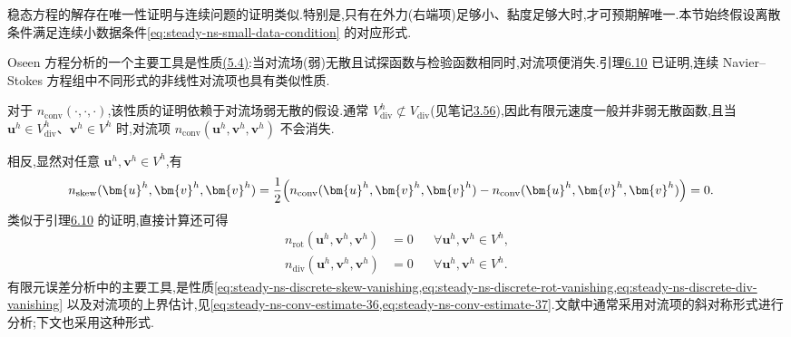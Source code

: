 稳态方程的解存在唯一性证明与连续问题的证明类似.特别是,只有在外力(右端项)足够小、黏度足够大时,才可预期解唯一.本节始终假设离散条件满足连续小数据条件\cref{eq:steady-ns-small-data-condition} 的对应形式.

\begin{note}[有限元误差分析中的对流项]\label{note:steady-ns-discrete-convection}
Oseen 方程分析的一个主要工具是性质\hyperref[eq:oseen-convection-skew]{(5.4)}:当对流场(弱)无散且试探函数与检验函数相同时,对流项便消失.引理\hyperref[lem:steady-ns-convection-vanishing]{6.10} 已证明,连续 Navier--Stokes 方程组中不同形式的非线性对流项也具有类似性质.

对于 $n_{\mathrm{conv}}(\cdot,\cdot,\cdot)$,该性质的证明依赖于对流场弱无散的假设.通常 $V_{\mathrm{div}}^h\not\subset V_{\mathrm{div}}$(见笔记\hyperref[note:mass-conservation-discrete-spaces]{3.56}),因此有限元速度一般并非弱无散函数,且当 $\bm{u}^h\in V_{\mathrm{div}}^h$、$\bm{v}^h\in V^h$ 时,对流项 $n_{\mathrm{conv}}(\bm{u}^h,\bm{v}^h,\bm{v}^h)$ 不会消失.

相反,显然对任意 $\bm{u}^h,\bm{v}^h\in V^h$,有
\begin{equation}\label{eq:steady-ns-discrete-skew-vanishing}
\begin{aligned}
  n_{\mathrm{skew}}(\bm{u}^h,\bm{v}^h,\bm{v}^h)
   &=\frac12\Bigl(
       n_{\mathrm{conv}}(\bm{u}^h,\bm{v}^h,\bm{v}^h)
       -n_{\mathrm{conv}}(\bm{u}^h,\bm{v}^h,\bm{v}^h)\Bigr)=0.
\end{aligned}
\end{equation}
类似于引理\hyperref[lem:steady-ns-convection-vanishing]{6.10} 的证明,直接计算还可得
\begin{align}
  n_{\mathrm{rot}}(\bm{u}^h,\bm{v}^h,\bm{v}^h)&=0
    &&\forall\bm{u}^h,\bm{v}^h\in V^h,\label{eq:steady-ns-discrete-rot-vanishing}\\
  n_{\mathrm{div}}(\bm{u}^h,\bm{v}^h,\bm{v}^h)&=0
    &&\forall\bm{u}^h,\bm{v}^h\in V^h.\label{eq:steady-ns-discrete-div-vanishing}
\end{align}
有限元误差分析中的主要工具,是性质\cref{eq:steady-ns-discrete-skew-vanishing,eq:steady-ns-discrete-rot-vanishing,eq:steady-ns-discrete-div-vanishing} 以及对流项的上界估计,见\cref{eq:steady-ns-conv-estimate-36,eq:steady-ns-conv-estimate-37}.文献中通常采用对流项的斜对称形式进行分析;下文也采用这种形式.
\end{note}

